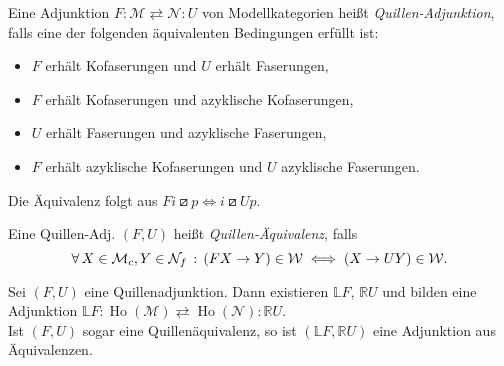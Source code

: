 \documentclass{cheat-sheet}
\newcommand{\lhhe}{\boxslash} %
\newcommand{\Weak}{\mathcal{W}} %
\newcommand{\ModC}{\mathcal{M}} %
\newcommand{\NodC}{\mathcal{N}} %
\DeclareMathOperator{\Ho}{Ho} %
\newcommand{\LD}[1]{\mathbb{L} #1} %
\newcommand{\RD}[1]{\mathbb{R} #1} %
\newenvironment{centertikzcd}
  {\begin{center}\begin{tikzcd}}
  {\end{tikzcd}\end{center}}
\begin{document}


\begin{defn}
  Eine Adjunktion $F : \ModC \rightleftarrows \NodC : U$ von Modellkategorien heißt \emph{Quillen-Adjunktion}, falls eine der folgenden äquivalenten Bedingungen erfüllt ist:
  \begin{itemize}
    \item $F$ erhält Kofaserungen und $U$ erhält Faserungen,
    \item $F$ erhält Kofaserungen und azyklische Kofaserungen,
    \item $U$ erhält Faserungen und azyklische Faserungen,
    \item $F$ erhält azyklische Kofaserungen und $U$ azyklische Faserungen.
  \end{itemize}
\end{defn}

\begin{bem}
  Die Äquivalenz folgt aus $Fi \lhhe p \iff i \lhhe Up$.
\end{bem}

\begin{defn}
  Eine Quillen-Adj. $(F, U)$ heißt \emph{Quillen-Äquivalenz}, falls
  \[ \fa{X \in \ModC_c, Y \in \NodC_f} (FX \to Y) \in \Weak \iff (X \to UY) \in \Weak. \]
\end{defn}

\begin{satz}
  Sei $(F, U)$ eine Quillenadjunktion. Dann existieren $\LD{F}$, $\RD{U}$ und bilden eine Adjunktion $\LD{F} : \Ho(\ModC) \rightleftarrows \Ho(\NodC) : \RD{U}$. \\
  Ist $(F, U)$ sogar eine Quillenäquivalenz, so ist $(\LD{F}, \RD{U})$ eine Adjunktion aus Äquivalenzen.
\end{satz}
\end{document}
